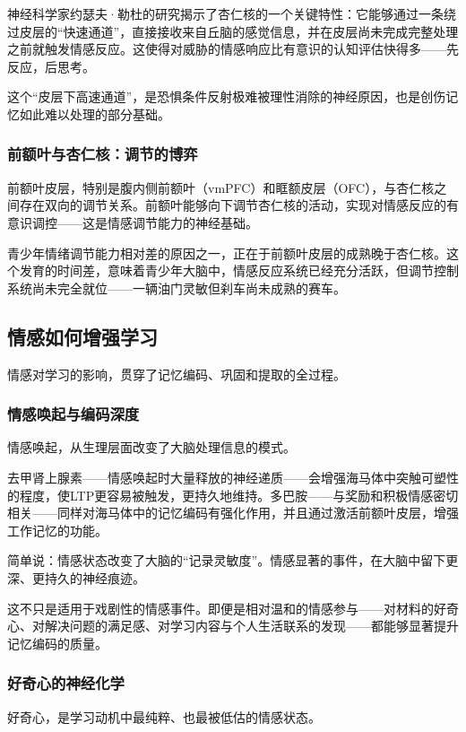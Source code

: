 \documentclass[11pt]{article}
\begin{document}
神经科学家约瑟夫·勒杜的研究揭示了杏仁核的一个关键特性：它能够通过一条绕过皮层的“快速通道”，直接接收来自丘脑的感觉信息，并在皮层尚未完成完整处理之前就触发情感反应。这使得对威胁的情感响应比有意识的认知评估快得多——先反应，后思考。

这个“皮层下高速通道”，是恐惧条件反射极难被理性消除的神经原因，也是创伤记忆如此难以处理的部分基础。
\subsubsection{前额叶与杏仁核：调节的博弈}
\label{sec:org1fa45e4}

前额叶皮层，特别是腹内侧前额叶（vmPFC）和眶额皮层（OFC），与杏仁核之间存在双向的调节关系。前额叶能够向下调节杏仁核的活动，实现对情感反应的有意识调控——这是情感调节能力的神经基础。

青少年情绪调节能力相对差的原因之一，正在于前额叶皮层的成熟晚于杏仁核。这个发育的时间差，意味着青少年大脑中，情感反应系统已经充分活跃，但调节控制系统尚未完全就位——一辆油门灵敏但刹车尚未成熟的赛车。
\subsection{情感如何增强学习}
\label{sec:org437b15f}

情感对学习的影响，贯穿了记忆编码、巩固和提取的全过程。
\subsubsection{情感唤起与编码深度}
\label{sec:org406eea1}

情感唤起，从生理层面改变了大脑处理信息的模式。

去甲肾上腺素——情感唤起时大量释放的神经递质——会增强海马体中突触可塑性的程度，使LTP更容易被触发，更持久地维持。多巴胺——与奖励和积极情感密切相关——同样对海马体中的记忆编码有强化作用，并且通过激活前额叶皮层，增强工作记忆的功能。

简单说：情感状态改变了大脑的“记录灵敏度”。情感显著的事件，在大脑中留下更深、更持久的神经痕迹。

这不只是适用于戏剧性的情感事件。即便是相对温和的情感参与——对材料的好奇心、对解决问题的满足感、对学习内容与个人生活联系的发现——都能够显著提升记忆编码的质量。
\subsubsection{好奇心的神经化学}
\label{sec:org91324c9}

好奇心，是学习动机中最纯粹、也最被低估的情感状态。
\end{document}
